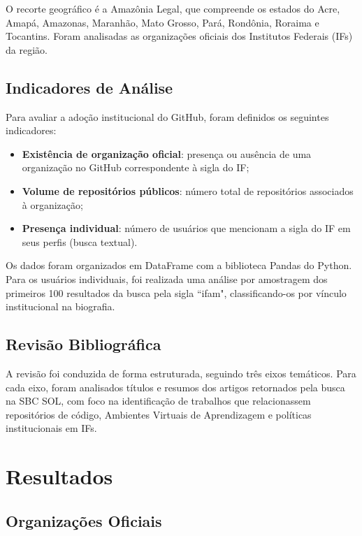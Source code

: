 \documentclass[english, spanish, brazilian]{RBIEarticle}
\begin{document}
O recorte geográfico é a Amazônia Legal, que compreende os estados do Acre, Amapá, Amazonas, Maranhão, Mato Grosso, Pará, Rondônia, Roraima e Tocantins. Foram analisadas as organizações oficiais dos Institutos Federais (IFs) da região.

\subsection{Indicadores de Análise}

Para avaliar a adoção institucional do GitHub, foram definidos os seguintes indicadores:
\begin{itemize}
	\item \textbf{Existência de organização oficial}: presença ou ausência de uma organização no GitHub correspondente à sigla do IF;
	\item \textbf{Volume de repositórios públicos}: número total de repositórios associados à organização;
	\item \textbf{Presença individual}: número de usuários que mencionam a sigla do IF em seus perfis (busca textual).
\end{itemize}

Os dados foram organizados em DataFrame com a biblioteca Pandas do Python. Para os usuários individuais, foi realizada uma análise por amostragem dos primeiros 100 resultados da busca pela sigla ``ifam", classificando-os por vínculo institucional na biografia.

\subsection{Revisão Bibliográfica}

A revisão foi conduzida de forma estruturada, seguindo três eixos temáticos. Para cada eixo, foram analisados títulos e resumos dos artigos retornados pela busca na SBC SOL, com foco na identificação de trabalhos que relacionassem repositórios de código, Ambientes Virtuais de Aprendizagem e políticas institucionais em IFs.

\section{Resultados}

\subsection{Organizações Oficiais}
\end{document}
